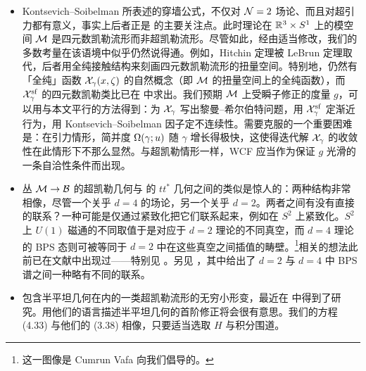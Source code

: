 \begin{itemize}
\item Kontsevich--Soibelman 所表述的穿墙公式，不仅对 $\mathcal{N}=2$ 场论、而且对超引力都有意义，事实上后者正是 \cite{Denef:2007vg} 的主要关注点。此时理论在 $\mathbb{R}^3\times S^1$ 上的模空间 $\mathcal{M}$ 是四元数凯勒流形而非超凯勒流形。尽管如此，经由适当修改，我们的多数考量在该语境中似乎仍然说得通。例如，Hitchin 定理被 LeBrun 定理取代，后者用全纯接触结构来刻画四元数凯勒流形的扭量空间。特别地，仍然有「全纯」函数 $\mathcal{X}_\gamma(x,\zeta)$ 的自然概念（即 $\mathcal{M}$ 的扭量空间上的全纯函数），而 $\mathcal{X}^{\mathrm{sf}}_\gamma$ 的四元数凯勒类比已在 \cite{Neitzke:2007ke} 中求出。我们预期 $\mathcal{M}$ 上受瞬子修正的度量 $g$，可以用与本文平行的方法得到：为 $\mathcal{X}_\gamma$ 写出黎曼--希尔伯特问题，用 $\mathcal{X}^{\mathrm{sf}}_\gamma$ 定渐近行为，用 Kontsevich--Soibelman 因子定不连续性。需要克服的一个重要困难是：在引力情形，简并度 $\Omega(\gamma;u)$ 随 $\gamma$ 增长得极快，这使得迭代解 $\mathcal{X}_\gamma$ 的收敛性在此情形下不那么显然。与超凯勒情形一样，WCF 应当作为保证 $g$ 光滑的一条自洽性条件而出现。

\item 丛 $\mathcal{M}\to\mathcal{B}$ 的超凯勒几何与 \cite{Cecotti:1991me,Cecotti:1992qh,Cecotti:1993rm} 的 $tt^*$ 几何之间的类似是惊人的：两种结构非常相像，尽管一个关乎 $d=4$ 的场论，另一个关乎 $d=2$。两者之间有没有直接的联系？一种可能是仅通过紧致化把它们联系起来，例如在 $S^2$ 上紧致化。$S^2$ 上 $U(1)$ 磁通的不同取值于是对应于 $d=2$ 理论的不同真空，而 $d=4$ 理论的 BPS 态则可被等同于 $d=2$ 中在这些真空之间插值的畴壁。\footnote{这一图像是 Cumrun Vafa 向我们倡导的。}相关的想法此前已在文献中出现过——特别见 \cite{Losev:1997tp,Losev:1999nt,Ooguri:2005vr}。另见 \cite{Dorey:1999zk,Ritz:2006rt}，其中给出了 $d=2$ 与 $d=4$ 中 BPS 谱之间一种略有不同的联系。

\item 包含半平坦几何在内的一类超凯勒流形的无穷小形变，最近在 \cite{Alexandrov:2008ds} 中得到了研究。用他们的语言描述半平坦几何的首阶修正将会很有意思。我们的方程 (4.33) 与他们的 (3.38) 相像，只要适当选取 $H$ 与积分围道。
\end{itemize}

